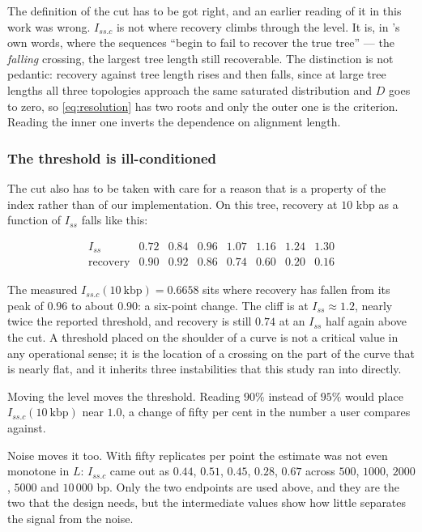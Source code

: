 \documentclass[preprint,12pt,authoryear]{elsarticle}
\newcommand{\Iss}{I_{ss}}
\newcommand{\Issc}{I_{ss.c}}
\theoremstyle{definition}
\theoremstyle{remark}
\begin{document}
The definition of the cut has to be got right, and an earlier reading of it in
this work was wrong. $\Issc$ is not where recovery climbs through
the level. It is, in \citet{xia2003iss}'s own words, where the sequences
``begin to fail to recover the true tree'' --- the \emph{falling} crossing,
the largest tree length still recoverable. The distinction is not pedantic:
recovery against tree length rises and then falls, since at large tree
lengths all three topologies approach the same saturated distribution and
$D$ goes to zero, so \eqref{eq:resolution} has two roots and only the
outer one is the criterion. Reading the inner one inverts the dependence on
alignment length.

\subsubsection{The threshold is ill-conditioned}
\label{sec:illcond}

The cut also has to be taken with care for a reason that is a property of the
index rather than of our implementation. On this tree, recovery at $10$ kbp
as a function of $\Iss$ falls like this:

\begin{equation}
\begin{array}{l|rrrrrrr}
\Iss & 0.72 & 0.84 & 0.96 & 1.07 & 1.16 & 1.24 & 1.30 \\
\text{recovery} & 0.90 & 0.92 & 0.86 & 0.74 & 0.60 & 0.20 & 0.16
\end{array}
\end{equation}

The measured $\Issc(10\ \mathrm{kbp})=0.6658$ sits where recovery has fallen
from its peak of $0.96$ to about $0.90$: a six-point change. The cliff is at
$\Iss\approx1.2$, nearly twice the reported threshold, and recovery is still
$0.74$ at an $\Iss$ half again above the cut. A threshold placed on the
shoulder of a curve is not a critical value in any operational sense; it is
the location of a crossing on the part of the curve that is nearly flat, and
it inherits three instabilities that this study ran into directly.

Moving the level moves the threshold. Reading $90\%$ instead of $95\%$ would
place $\Issc(10\ \mathrm{kbp})$ near $1.0$, a change of fifty per cent in the
number a user compares against.

Noise moves it too. With fifty replicates per point the estimate was not even
monotone in $L$: $\Issc$ came out as $0.44$, $0.51$, $0.45$, $0.28$, $0.67$
across $500$, $1000$, $2000$, $5000$ and $10\,000$ bp. Only the two endpoints
are used above, and they are the two that the design needs, but the
intermediate values show how little separates the signal from the noise.
\end{document}

